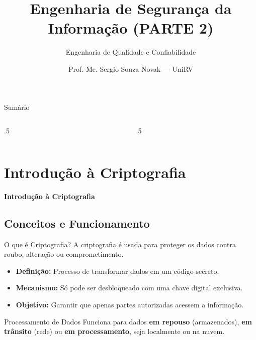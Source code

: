 \documentclass[aspectratio=169]{beamer}
\title[Engenharia de Segurança]{Engenharia de Segurança da Informação (PARTE 2)}
\subtitle{Engenharia de Qualidade e Confiabilidade}
\author{Prof. Me. Sergio Souza Novak — UniRV}
\begin{document}
\frame[plain]{\titlepage}

\begin{frame}{Sumário}
    \begin{columns}[t]
        \begin{column}{.5\textwidth}
            \tableofcontents[sections={1-2}]
        \end{column}
        \begin{column}{.5\textwidth}
            \tableofcontents[sections={3-4}]
        \end{column}
    \end{columns}
\end{frame}

\section{Introdução à Criptografia}
{
\begin{frame}[plain]
    \centering
    \Huge \color{white} \bfseries Introdução à Criptografia
\end{frame}
}

\subsection{Conceitos e Funcionamento}

\begin{frame}{O que é Criptografia?}
    A criptografia é usada para proteger os dados contra roubo, alteração ou comprometimento.
    \begin{itemize}
        \item \textbf{Definição:} Processo de transformar dados em um código secreto.
        \item \textbf{Mecanismo:} Só pode ser desbloqueado com uma chave digital exclusiva.
        \item \textbf{Objetivo:} Garantir que apenas partes autorizadas acessem a informação.
    \end{itemize}
    \begin{block}{Processamento de Dados}
        Funciona para dados \textbf{em repouso} (armazenados), \textbf{em trânsito} (rede) ou \textbf{em processamento}, seja localmente ou na nuvem.
    \end{block}
\end{frame}
\end{document}
